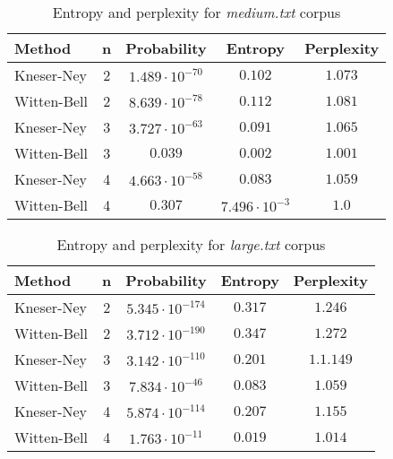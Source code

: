 \documentclass[10pt, a4paper]{article}
\begin{document}
\begin{table}[h]
\caption{Entropy and perplexity for \textit{medium.txt} corpus}
\label{tab:medium}
\begin{center}
\begin{tabular}{lcccc}
\toprule
Method & n & Probability & Entropy & Perplexity \\
\midrule
Kneser-Ney & 2 & $1.489 \cdot 10^{-70}$ & $0.102$ & $1.073$ \\
Witten-Bell & 2 & $8.639 \cdot 10^{-78}$ & $0.112$ & $1.081$ \\

Kneser-Ney & 3 & $3.727 \cdot 10^{-63}$ & $0.091$ & $1.065$ \\
Witten-Bell & 3 & $0.039$ & $0.002$ & $1.001$ \\

Kneser-Ney & 4 & $4.663 \cdot 10^{-58}$ & $0.083$ & $1.059$ \\
Witten-Bell & 4 & $0.307$ & $7.496 \cdot 10^{-3}$ & $1.0$ \\
\bottomrule
\end{tabular}
\end{center}
\end{table}


\begin{table}[htb!]
\caption{Entropy and perplexity for \textit{large.txt} corpus}
\label{tab:large}
\begin{center}
\begin{tabular}{lcccc}
\toprule
Method & n & Probability & Entropy & Perplexity \\
\midrule
Kneser-Ney & 2 & $5.345 \cdot 10^{-174}$ & $0.317$ & $1.246$ \\
Witten-Bell & 2 & $3.712 \cdot 10^{-190}$ & $0.347$ & $1.272$ \\

Kneser-Ney & 3 & $3.142 \cdot 10^{-110}$ & $0.201$ & $1.1.149$ \\
Witten-Bell & 3 & $7.834 \cdot 10^{-46}$ & $0.083$ & $1.059$ \\

Kneser-Ney & 4 & $5.874 \cdot 10^{-114}$ & $0.207$ & $1.155$ \\
Witten-Bell & 4 & $1.763 \cdot 10^{-11}$ & $0.019$ & $1.014$ \\
\bottomrule
\end{tabular}
\end{center}
\end{table}

\newpage
\end{document}
